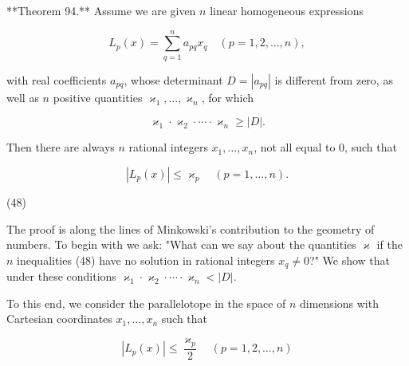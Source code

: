 **Theorem 94.** Assume we are given $n$ linear homogeneous expressions

$$L_p(x) = \sum_{q=1}^{n} a_{pq} x_q \quad (p = 1, 2, \ldots, n),$$

with real coefficients $a_{pq}$, whose determinant $D = |a_{pq}|$ is different from zero, as well as $n$ positive quantities $\varkappa_1, \ldots, \varkappa_n$, for which

$$\varkappa_1 \cdot \varkappa_2 \cdot \cdots \cdot \varkappa_n \geq |D|.$$

Then there are always $n$ rational integers $x_1, \ldots, x_n$, not all equal to 0, such that

$$|L_p(x)| \leq \varkappa_p \quad (p = 1, \ldots, n).$$

(48)

The proof is along the lines of Minkowski's contribution to the geometry of numbers. To begin with we ask: "What can we say about the quantities $\varkappa$ if the $n$ inequalities (48) have no solution in rational integers $x_q \neq 0$?" We show that under these conditions $\varkappa_1 \cdot \varkappa_2 \cdot \cdots \cdot \varkappa_n < |D|$.

To this end, we consider the parallelotope in the space of $n$ dimensions with Cartesian coordinates $x_1, \ldots, x_n$ such that

$$|L_p(x)| \leq \frac{\varkappa_p}{2} \quad (p = 1, 2, \ldots, n)$$

